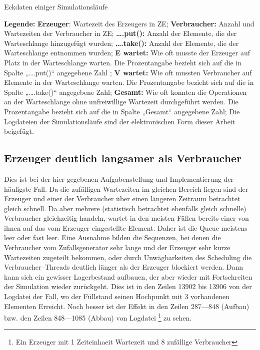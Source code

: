 \begin{landscape}
\begin{footnotesize}
\begin{table}[H]
\begin{center}
\caption{Eckdaten einiger Simulationsläufe}
\label{tab:ergebnisse}
\end{center}
\end{table}
\textbf{Legende:} \textbf{Erzeuger}: Wartezeit des Erzeugers in \ac{ZE}; \textbf{Verbraucher:} Anzahl und Wartezeiten der Verbraucher in \ac{ZE}; \textbf{….put():} Anzahl der Elemente, die der Warteschlange hinzugefügt wurden; \textbf{….take():} Anzahl der Elemente, die der Warteschlange entnommen wurden; \textbf{E wartet:} Wie oft musste der Erzeuger auf Platz in der Warteschlange warten. Die Prozentangabe bezieht sich auf die in Spalte „….put()“ angegebene Zahl ; \textbf{V wartet:} Wie oft mussten Verbraucher auf Elemente in der Warteschlange warten. Die Prozentangabe bezieht sich auf die in Spalte „….take()“ angegebene Zahl; \textbf{Gesamt:} Wie oft konnten die Operationen an der Warteschlange ohne unfreiwillige Wartezeit durchgeführt werden. Die Prozentangabe bezieht sich auf die in Spalte „Gesamt“ angegebene Zahl; Die Logdateien der Simulationsläufe sind der elektronischen Form dieser Arbeit beigefügt.
\end{footnotesize}
\end{landscape}


\subsection{Erzeuger deutlich langsamer als Verbraucher} %
\label{sub:erzeuger_langsamer_als_verbraucher}
Dies ist bei der hier gegebenen Aufgabenstellung und Implementierung der häufigste Fall. Da die zufälligen Wartezeiten im gleichen Bereich liegen sind der Erzeuger und einer der Verbraucher über einen längeren Zeitraum betrachtet gleich schnell. Da aber mehrere (statistisch betrachtet ebenfalls gleich schnelle) Verbraucher gleichzeitig handeln, wartet in den meisten Fällen bereits einer von ihnen auf das vom Erzeuger eingestellte Element. Daher ist die Queue meistens leer oder fast leer. Eine Ausnahme bilden die Sequenzen, bei denen die Verbraucher vom Zufallsgenerator sehr lange und der Erzeuger sehr kurze Wartezeiten zugeteilt bekommen, oder durch Unwägbarkeiten des Scheduling die Verbraucher–Threads deutlich länger als der Erzeuger blockiert werden. Dann kann sich ein gewisser Lagerbestand aufbauen, der aber wieder mit Fortschreiten der Simulation wieder zurückgeht. Dies ist in den Zeilen 13902 bis 13906 von der Logdatei  der Fall, wo der Füllstand seinen Hochpunkt mit 3 vorhandenen Elementen Erreicht. Noch besser ist der Effekt in den Zeilen 287—848 (Aufbau) bzw. den Zeilen 848—1085 (Abbau) von Logdatei \footnote{Ein Erzeuger mit 1 Zeiteinhaeit Wartezeit und 8 zufällige Verbraucher} zu sehen.

